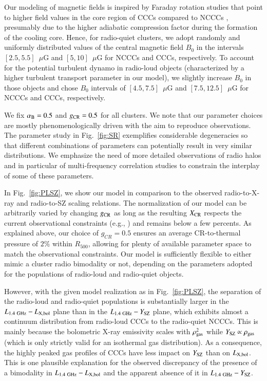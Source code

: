 \documentclass[useAMS,usenatbib]{mn2e}
\begin{document}
Our modeling of magnetic fields is inspired by Faraday rotation studies that
point to higher field values in the core region of CCCs compared to NCCCs
\citep{2011A&A...529A..13K, 2010A&A...513A..30B}, presumably due to the higher
adiabatic compression factor during the formation of the cooling core. Hence,
for radio-quiet clusters, we adopt randomly and uniformly distributed values of
the central magnetic field $B_0$ in the intervals $[2.5,5.5]$~$\mu$G and
$[5,10]$~$\mu$G for NCCCs and CCCs, respectively. To account for the potential
turbulent dynamo in radio-loud objects (characterized by a higher turbulent
transport parameter in our model), we slightly increase $B_0$ in those objects
and chose $B_0$ intervals of $[4.5,7.5]$~$\mu$G and $[7.5,12.5]$~$\mu$G for
NCCCs and CCCs, respectively.

We fix $\alpha_{{\mathrm{B}}}=0.5$ and $g_{{\mathrm{CR}}}=0.5$ for all clusters. We note
that our parameter choices are mostly phenomenologically driven with the aim to
reproduce observations. The parameter study in Fig.~\ref{fig:SR} exemplifies
considerable degeneracies so that different combinations of parameters can
potentially result in very similar distributions. We emphasize the need of more
detailed observations of radio halos and in particular of multi-frequency
correlation studies to constrain the interplay of some of these parameters.

In Fig.~\ref{fig:PLSZ}, we show our model in comparison to the observed
radio-to-X-ray and radio-to-SZ scaling relations. The normalization of our model
can be arbitrarily varied by changing $g_{{\mathrm{CR}}}$ as long as the resulting
$X_{{\mathrm{CR}}}$ respects the current observational constraints
(e.g., \citealp{2011arXiv1111.5544M}) and remains below a few percents. As
explained above, our choice of $g_{CR}=0.5$ ensures an average CR-to-thermal
pressure of $2\%$ within $R_{500}$, allowing for plenty of available parameter
space to match the observational constraints.  Our model is sufficiently
flexible to either mimic a cluster radio bimodality or not, depending on the
parameters adopted for the populations of radio-loud and radio-quiet
objects. 

However, with the given model realization as in Fig.~\ref{fig:PLSZ}, the
separation of the radio-loud and radio-quiet populations is substantially larger in
the $L_{1.4~{\mathrm{GHz}}}-L_{{\mathrm{X,bol}}}$ plane than in the
$L_{1.4~{\mathrm{GHz}}}-Y_{{\mathrm{SZ}}}$ plane, which exhibits almost a continuum
distribution from radio-loud CCCs to the radio-quiet NCCCs. This is mainly
because the bolometric X-ray emissivity scales with $\rho_{{\mathrm{gas}}}^2$ while
$Y_{{\mathrm{SZ}}}\propto\rho_{{\mathrm{gas}}}$ (which is only strictly valid for an
isothermal gas distribution). As a consequence, the highly peaked gas profiles
of CCCs have less impact on $Y_{{\mathrm{SZ}}}$ than on $L_{{\mathrm{X,bol}}}$. This is
one plausible explanation for the observed discrepancy of the presence of a
bimodality in $L_{1.4~{\mathrm{GHz}}}-L_{{\mathrm{X,bol}}}$ and the apparent absence of it
in $L_{1.4~{\mathrm{GHz}}}-Y_{{\mathrm{SZ}}}$. 
\end{document}
